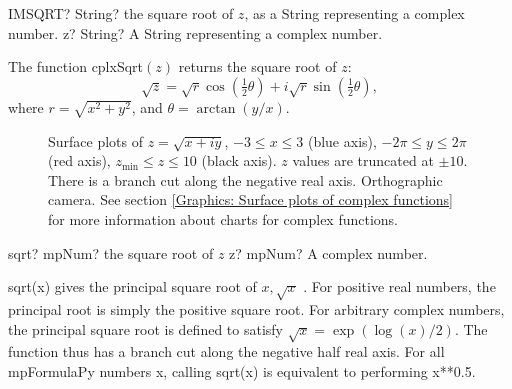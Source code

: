 \vspace{0.6cm}
\begin{mpFunctionsExtract}
	\mpWorksheetFunctionOneNotImplemented
	{IMSQRT? String? the square root of $z$, as a String representing a complex number.}
	{z? String? A String representing a complex number.}
\end{mpFunctionsExtract}

\vspace{0.3cm}

The function \textsf{cplxSqrt$(z)$} returns the square root of $z$: 
\begin{equation}
	\sqrt{z} = \sqrt{r} \cos\left(\tfrac{1}{2}\theta\right) + i  \sqrt{r} \sin\left(\tfrac{1}{2}\theta\right),
\end{equation}
where $r=\sqrt{x^2+y^2}$, and $\theta=\arctan(y/x)$.


\begin{figure}[ht]%
	\centering
	\qquad
	\caption[Complex Square Root]{Surface plots of $z = \sqrt{x + iy}$, $-3 \leq x \leq 3$ (blue axis), $-2 \pi \leq y \leq 2\pi$ (red axis), $z_{\text{min}} \leq z \leq 10$ (black axis). $z$ values are truncated at $\pm 10$. There is a branch cut along the negative real axis. Orthographic camera. See section \ref{Graphics: Surface plots of complex functions} for more information about charts for complex functions.} 
	\label{fig:Complex Square Root}%
\end{figure}

\vspace{0.6cm}
\begin{mpFunctionsExtract}
	\mpFunctionOne
	{sqrt? mpNum? the square root of $z$}
	{z? mpNum? A complex number.}
\end{mpFunctionsExtract}

\vspace{0.3cm}


sqrt(x) gives the principal square root of $x,\sqrt{x}$ . For positive real numbers, the principal
root is simply the positive square root. For arbitrary complex numbers, the principal
square root is defined to satisfy $\sqrt{x}=\exp(\log(x)/2)$. The function thus has a branch cut along the negative half real axis.
For all mpFormulaPy numbers x, calling sqrt(x) is equivalent to performing x**0.5.

